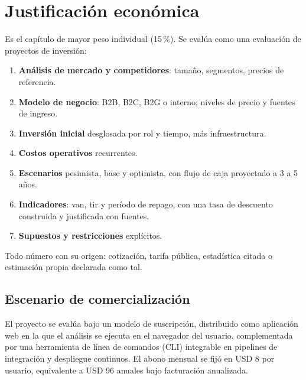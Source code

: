
\chapter{Justificación económica}\label{cap:economica}

\begin{guia}
Es el capítulo de mayor peso individual (15\,\%). Se evalúa como una
evaluación de proyectos de inversión:
\begin{enumerate}
    \item \textbf{Análisis de mercado y competidores}: tamaño, segmentos,
          precios de referencia.
    \item \textbf{Modelo de negocio}: B2B, B2C, B2G o interno; niveles de
          precio y fuentes de ingreso.
    \item \textbf{Inversión inicial} desglosada por rol y tiempo, más
          infraestructura.
    \item \textbf{Costos operativos} recurrentes.
    \item \textbf{Escenarios} pesimista, base y optimista, con flujo de caja
          proyectado a 3 a 5 años.
    \item \textbf{Indicadores}: \gls{van}, \gls{tir} y período de repago,
          con una tasa de descuento construida y justificada con fuentes.
    \item \textbf{Supuestos y restricciones} explícitos.
\end{enumerate}
Todo número con su origen: cotización, tarifa pública, estadística
citada o estimación propia declarada como tal.
\end{guia}

\section{Escenario de comercialización}\label{sec:n5.1}

El proyecto se evalúa bajo un modelo de suscripción, distribuido como aplicación web en la que el análisis se ejecuta en el navegador del usuario, complementada por una herramienta de línea de comandos (CLI) integrable en pipelines de integración y despliegue continuos. El abono mensual se fijó en USD 8 por usuario, equivalente a USD 96 anuales bajo facturación anualizada.

